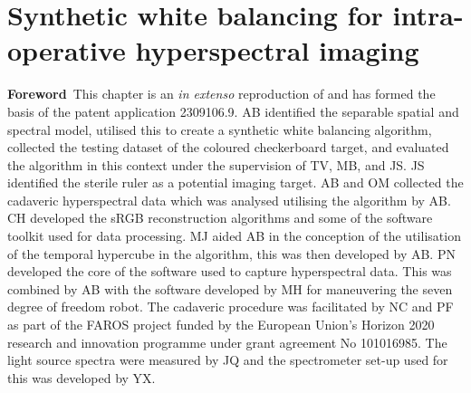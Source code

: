 % 
\chapter[Synthetic white balancing]{Synthetic white balancing for intra-operative hyperspectral imaging}
\label{chap:SWB}

\begin{center}
\begin{minipage}[b]{0.9\linewidth}
\small
\textbf{Foreword\,}
This chapter is an \emph{in extenso} reproduction of \citet{Bahl2023} and has formed the basis of the patent application 2309106.9. 
\newline
AB identified the separable spatial and spectral model, utilised this to create a synthetic white balancing algorithm, collected the testing dataset of the coloured checkerboard target, and evaluated the algorithm in this context under the supervision of TV, MB, and JS. JS identified the sterile ruler as a potential imaging target. AB and OM collected the cadaveric hyperspectral data which was analysed utilising the algorithm by AB. CH developed the sRGB reconstruction algorithms and some of the software toolkit used for data processing. MJ aided AB in the conception of the utilisation of the temporal hypercube in the algorithm, this was then developed by AB. PN developed the core of the software used to capture hyperspectral data. This was combined by AB with the software developed by MH for maneuvering the seven degree of freedom robot. The cadaveric procedure was facilitated by NC and PF as part of the FAROS project funded by the European Union’s Horizon 2020 research and innovation programme under grant agreement No 101016985. The light source spectra were measured by JQ and the spectrometer set-up used for this was developed by YX. 
\end{minipage}
\end{center}

\minitoc



